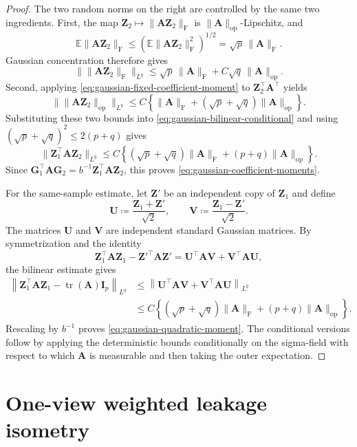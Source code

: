 \documentclass[11pt]{article}
\newcommand{\trans}{\top}
\begin{document}
\begin{proof}
The two random norms on the right are controlled by the same two ingredients.
First, the map
$\bm Z_2\mapsto\|\bm A\bm Z_2\|_{\mathrm F}$ is
$\|\bm A\|_{\mathrm{op}}$-Lipschitz, and
\[
  \mathbb E\|\bm A\bm Z_2\|_{\mathrm F}
  \le
  \left(
    \mathbb E\|\bm A\bm Z_2\|_{\mathrm F}^2
  \right)^{1/2}
  =
  \sqrt p\,\|\bm A\|_{\mathrm F}.
\]
Gaussian concentration therefore gives
\[
  \bigl\|\|\bm A\bm Z_2\|_{\mathrm F}\bigr\|_{L^q}
  \le
  \sqrt p\,\|\bm A\|_{\mathrm F}
  +
  C\sqrt q\,\|\bm A\|_{\mathrm{op}}.
\]
Second, applying \cref{eq:gaussian-fixed-coefficient-moment} to
$\bm Z_2^\trans\bm A^\trans$ yields
\[
  \bigl\|\|\bm A\bm Z_2\|_{\mathrm{op}}\bigr\|_{L^q}
  \le
  C\left\{
    \|\bm A\|_{\mathrm F}
    +
    (\sqrt p+\sqrt q)\|\bm A\|_{\mathrm{op}}
  \right\}.
\]
Substituting these two bounds into
\cref{eq:gaussian-bilinear-conditional} and using
$(\sqrt p+\sqrt q)^2\le2(p+q)$ gives
\[
  \|\bm Z_1^\trans\bm A\bm Z_2\|_{L^q}
  \le
  C\left\{
    (\sqrt p+\sqrt q)\|\bm A\|_{\mathrm F}
    +(p+q)\|\bm A\|_{\mathrm{op}}
  \right\}.
\]
Since
$\bm G_1^\trans\bm A\bm G_2
=b^{-1}\bm Z_1^\trans\bm A\bm Z_2$, this proves
\cref{eq:gaussian-coefficient-moments}.

For the same-sample estimate, let $\bm Z'$ be an independent copy of
$\bm Z_1$ and define
\[
  \bm U\coloneqq\frac{\bm Z_1+\bm Z'}{\sqrt2},
  \qquad
  \bm V\coloneqq\frac{\bm Z_1-\bm Z'}{\sqrt2}.
\]
The matrices $\bm U$ and $\bm V$ are independent standard Gaussian matrices.
By symmetrization and the identity
\[
  \bm Z_1^\trans\bm A\bm Z_1
  -
  \bm Z'^\trans\bm A\bm Z'
  =
  \bm U^\trans\bm A\bm V
  +
  \bm V^\trans\bm A\bm U,
\]
the bilinear estimate gives
\[
\begin{aligned}
  \left\|
    \bm Z_1^\trans\bm A\bm Z_1
    -
    \operatorname{tr}(\bm A)\bm I_p
  \right\|_{L^q}
  &\le
  \left\|
    \bm U^\trans\bm A\bm V
    +
    \bm V^\trans\bm A\bm U
  \right\|_{L^q} \\
  &\le
  C\left\{
    (\sqrt p+\sqrt q)\|\bm A\|_{\mathrm F}
    +(p+q)\|\bm A\|_{\mathrm{op}}
  \right\}.
\end{aligned}
\]
Rescaling by $b^{-1}$ proves
\cref{eq:gaussian-quadratic-moment}. The conditional versions follow by
applying the deterministic bounds conditionally on the sigma-field with
respect to which $\bm A$ is measurable and then taking the outer
expectation.
\end{proof}



\section{One-view weighted leakage isometry}
\label{app:one-view-isometry}
\end{document}
